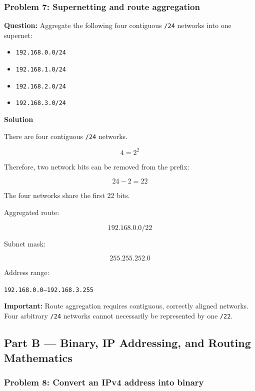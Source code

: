 \subsubsection*{Problem 7: Supernetting and route aggregation}

\textbf{Question:} Aggregate the following four contiguous \texttt{/24} networks into one supernet:

\begin{itemize}
\item \texttt{192.168.0.0/24}
\item \texttt{192.168.1.0/24}
\item \texttt{192.168.2.0/24}
\item \texttt{192.168.3.0/24}
\end{itemize}

\textbf{Solution}

There are four contiguous \texttt{/24} networks.



\[
4=2^2
\]



Therefore, two network bits can be removed from the prefix:



\[
24-2=22
\]



The four networks share the first 22 bits.

Aggregated route:



\[
\boxed{192.168.0.0/22}
\]



Subnet mask:



\[
\boxed{255.255.252.0}
\]



Address range:

\texttt{192.168.0.0--192.168.3.255}

\textbf{Important:} Route aggregation requires contiguous, correctly aligned networks. Four arbitrary \texttt{/24} networks cannot necessarily be represented by one \texttt{/22}.

\subsection{Part B --- Binary, IP Addressing, and Routing Mathematics}
\subsubsection*{Problem 8: Convert an IPv4 address into binary}

